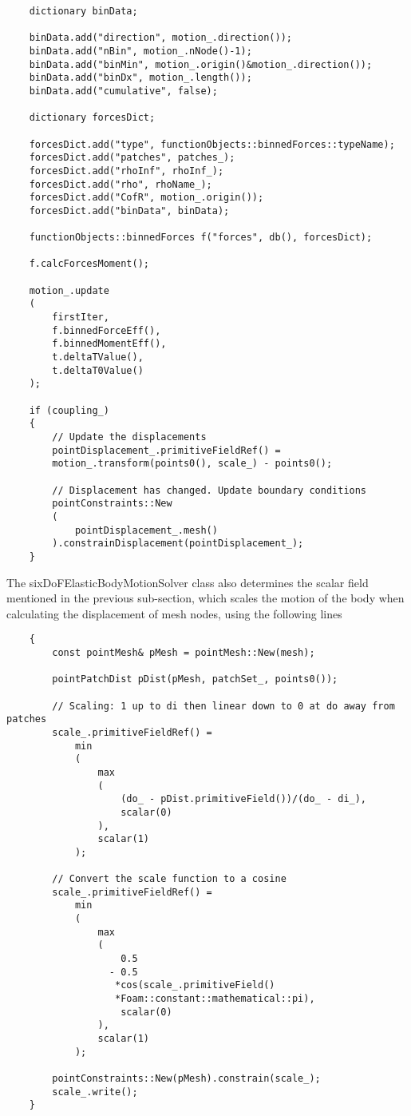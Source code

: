 \begin{lstlisting}
    dictionary binData;    

    binData.add("direction", motion_.direction());
    binData.add("nBin", motion_.nNode()-1);
    binData.add("binMin", motion_.origin()&motion_.direction());
    binData.add("binDx", motion_.length());
    binData.add("cumulative", false);

    dictionary forcesDict;

    forcesDict.add("type", functionObjects::binnedForces::typeName);
    forcesDict.add("patches", patches_);
    forcesDict.add("rhoInf", rhoInf_);
    forcesDict.add("rho", rhoName_);
    forcesDict.add("CofR", motion_.origin());
    forcesDict.add("binData", binData);

    functionObjects::binnedForces f("forces", db(), forcesDict);

    f.calcForcesMoment();

    motion_.update
    (
        firstIter,
        f.binnedForceEff(),
        f.binnedMomentEff(),
        t.deltaTValue(),
        t.deltaT0Value()
    );
    
    if (coupling_)
    {
        // Update the displacements
        pointDisplacement_.primitiveFieldRef() =
        motion_.transform(points0(), scale_) - points0();

        // Displacement has changed. Update boundary conditions
        pointConstraints::New
        (
            pointDisplacement_.mesh()
        ).constrainDisplacement(pointDisplacement_);
    }
\end{lstlisting}

The sixDoFElasticBodyMotionSolver class also determines the scalar field mentioned in the previous sub-section, which scales the motion of the body when calculating the displacement of mesh nodes, using the following lines

\begin{lstlisting}
    {
        const pointMesh& pMesh = pointMesh::New(mesh);

        pointPatchDist pDist(pMesh, patchSet_, points0());
        
        // Scaling: 1 up to di then linear down to 0 at do away from patches
        scale_.primitiveFieldRef() =
            min
            (
                max
                (
                    (do_ - pDist.primitiveField())/(do_ - di_),
                    scalar(0)
                ),
                scalar(1)
            );

        // Convert the scale function to a cosine
        scale_.primitiveFieldRef() =
            min
            (
                max
                (
                    0.5
                  - 0.5
                   *cos(scale_.primitiveField()
                   *Foam::constant::mathematical::pi),
                    scalar(0)
                ),
                scalar(1)
            );

        pointConstraints::New(pMesh).constrain(scale_);
        scale_.write();
    }
\end{lstlisting}

